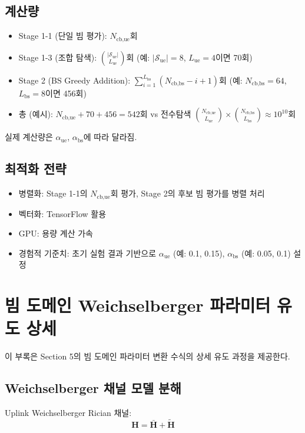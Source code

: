\documentclass[10pt]{article}
\begin{document}
\subsection{계산량}
\begin{itemize}
    \item Stage 1-1 (단일 빔 평가): $N_{\text{cb,ue}}$회
    \item Stage 1-3 (조합 탐색): $\binom{|\mathcal{S}_{\text{ue}}|}{L_{\text{ue}}}$회 (예: $|\mathcal{S}_{\text{ue}}| = 8$, $L_{\text{ue}} = 4$이면 70회)
    \item Stage 2 (BS Greedy Addition): $\sum_{i=1}^{L_{\text{bs}}} (N_{\text{cb,bs}} - i + 1)$회 (예: $N_{\text{cb,bs}} = 64$, $L_{\text{bs}} = 8$이면 456회)
    \item 총 (예시): $N_{\text{cb,ue}} + 70 + 456 = 542$회 vs 전수탐색 $\binom{N_{\text{cb,ue}}}{L_{\text{ue}}} \times \binom{N_{\text{cb,bs}}}{L_{\text{bs}}} \approx 10^{10}$회
\end{itemize}

실제 계산량은 $\alpha_{\text{ue}}$, $\alpha_{\text{bs}}$에 따라 달라짐.

\subsection{최적화 전략}
\begin{itemize}
    \item 병렬화: Stage 1-1의 $N_{\text{cb,ue}}$회 평가, Stage 2의 후보 빔 평가를 병렬 처리
    \item 벡터화: TensorFlow 활용
    \item GPU: 용량 계산 가속
    \item 경험적 기준치: 초기 실험 결과 기반으로 $\alpha_{\text{ue}}$ (예: 0.1, 0.15), $\alpha_{\text{bs}}$ (예: 0.05, 0.1) 설정
\end{itemize}

\newpage
\appendix
\section{빔 도메인 Weichselberger 파라미터 유도 상세}

이 부록은 Section 5의 빔 도메인 파라미터 변환 수식의 상세 유도 과정을 제공한다.

\subsection{Weichselberger 채널 모델 분해}

Uplink Weichselberger Rician 채널:
\begin{equation}
\mathbf{H} = \bar{\mathbf{H}} + \tilde{\mathbf{H}}
\end{equation}
\end{document}
